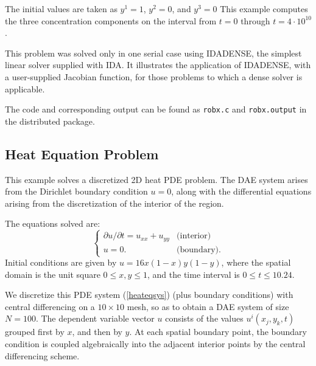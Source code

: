 The initial values are taken as $y^1 = 1$, $y^2 = 0$, and $y^3 = 0$
This example computes the three concentration components on the interval
from $t=0$ through $t=4 \cdot 10^{10}$.

This problem was solved only in one serial case using IDADENSE, the simplest 
linear solver supplied with IDA. It illustrates the application of 
IDADENSE, with a user-supplied Jacobian function, for those problems to which
a dense solver is applicable.

The code and corresponding output can be found as {\tt robx.c} and 
{\tt robx.output} in the distributed package.


\subsection{Heat Equation Problem}

This example solves a discretized 2D heat PDE problem. The DAE system
arises from the Dirichlet boundary condition $u = 0$, along with the 
differential equations arising from the discretization of the interior 
of the region. 

The equations solved are:
\begin{equation}
\left\{ \begin{array}{ll}
     \partial u / \partial t  = u_{xx} + u_{yy}  & \mbox{(interior)} \\
      u = 0. & \mbox{(boundary)}.
\end{array} \right.                                       \label{heateqsys}
\end{equation}
Initial conditions are given by $u = 16x(1-x)y(1-y)$, where the spatial domain
is the unit square $0 \leq x,y \leq 1$, and the time interval is 
$0 \leq t \leq 10.24$.

We discretize this PDE system (\ref{heateqsys}) (plus boundary conditions)
with central differencing on a $10 \times 10$ mesh, so as to obtain a
DAE system of size $N = 100$.  The dependent variable vector $u$
consists of the values $u^i(x_j,y_k,t)$ grouped first by $x$, and then
 by $y$.  At each spatial boundary point, the boundary condition is coupled
algebraically into the adjacent interior points by the central differencing
scheme. 

